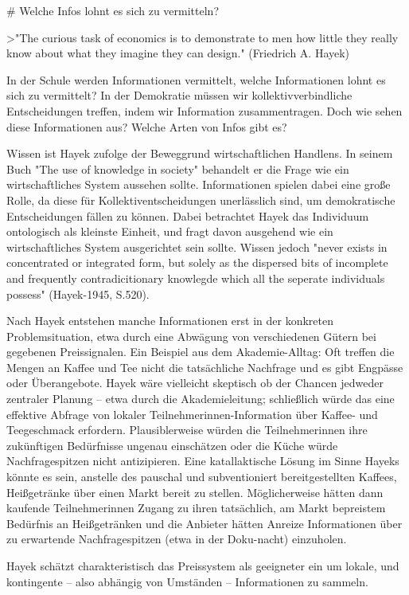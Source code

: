 # Welche Infos lohnt es sich zu vermitteln?

>"The curious task of economics is to demonstrate to men how little they really know about what they imagine they can design." (Friedrich A. Hayek)

In der Schule werden Informationen vermittelt, welche Informationen lohnt es sich zu vermittelt?
In der Demokratie müssen wir kollektivverbindliche Entscheidungen treffen, indem wir Information zusammentragen.
Doch wie sehen diese Informationen aus? Welche Arten von Infos gibt es?

Wissen ist Hayek zufolge der Beweggrund wirtschaftlichen Handlens.
In seinem Buch "The use of knowledge in society" behandelt er die Frage wie ein wirtschaftliches System aussehen sollte.
Informationen spielen dabei eine große Rolle, da diese für Kollektiventscheidungen unerlässlich sind, um demokratische Entscheidungen fällen zu können.  
Dabei betrachtet Hayek das Individuum ontologisch als kleinste Einheit, und fragt davon ausgehend wie ein wirtschaftliches System ausgerichtet sein sollte.
Wissen jedoch "never exists in concentrated or integrated form, but solely as the dispersed bits of incomplete and frequently contradicitionary knowlegde which all the seperate individuals possess" (Hayek-1945, S.520).

Nach Hayek entstehen manche Informationen erst in der konkreten Problemsituation, etwa durch eine Abwägung von verschiedenen Gütern bei gegebenen Preissignalen.
Ein Beispiel aus dem Akademie-Alltag: Oft treffen die Mengen an Kaffee und Tee nicht die tatsächliche Nachfrage und es gibt Engpässe oder Überangebote.
Hayek wäre vielleicht skeptisch ob der Chancen jedweder zentraler Planung – etwa durch die Akademieleitung; schließlich würde das eine effektive Abfrage von lokaler Teilnehmerinnen-Information über Kaffee- und Teegeschmack erfordern.
Plausiblerweise würden die Teilnehmerinnen ihre zukünftigen Bedürfnisse ungenau einschätzen oder die Küche würde Nachfragespitzen nicht antizipieren.
Eine katallaktische Lösung im Sinne Hayeks könnte es sein, anstelle des pauschal und subventioniert bereitgestellten Kaffees, Heißgetränke über einen Markt bereit zu stellen.
Möglicherweise hätten dann kaufende Teilnehmerinnen Zugang zu ihren tatsächlich, am Markt bepreistem Bedürfnis an Heißgetränken und die Anbieter hätten Anreize Informationen über zu erwartende Nachfragespitzen (etwa in der Doku-nacht) einzuholen.

Hayek schätzt charakteristisch das Preissystem als geeigneter ein um lokale, und kontingente – also abhängig von Umständen – Informationen zu sammeln.


